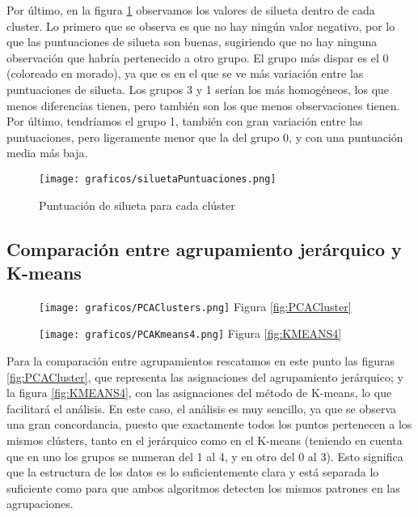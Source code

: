 \documentclass[a4paper,onecolumn]{extarticle}
\begin{document}
\begin{sloppypar}
Por último, en la figura \ref{fig:siluetaClusters} observamos los valores de silueta dentro de cada cluster. Lo primero que se observa es que no hay ningún 
valor negativo, por lo que las puntuaciones de silueta son buenas, sugiriendo que no hay ninguna observación que habría pertenecido a otro grupo. El grupo más 
dispar es el 0 (coloreado en morado), ya que es en el que se ve más variación entre las puntuaciones de silueta. Los grupos 3 y 1 serían los más homogéneos, 
los que menos diferencias tienen, pero también son los que menos observaciones tienen. Por último, tendríamos el grupo 1, también con gran 
variación entre las puntuaciones, pero ligeramente menor que la del grupo 0, y con una puntuación media más baja.
\begin{center}
    \begin{figure}[h!]
        \centering
        \texttt{[image: graficos/siluetaPuntuaciones.png]}
        \caption{Puntuación de silueta para cada clúster}
        \label{fig:siluetaClusters}
    \end{figure}
\end{center}

\subsection{Comparación entre agrupamiento jerárquico y K-means} \label{comparacion}
\begin{center}
    \begin{figure}[h!]
        \centering
        \begin{minipage}{0.49\textwidth}
            \centering
            \texttt{[image: graficos/PCAClusters.png]}
            Figura \ref{fig:PCACluster}
        \end{minipage}
        \hspace{0.005\textwidth} %
        \begin{minipage}{0.49\textwidth}
            \centering
            \texttt{[image: graficos/PCAKmeans4.png]}
            Figura \ref{fig:KMEANS4}
        \end{minipage}
    \end{figure}
\end{center}
Para la comparación entre agrupamientos rescatamos en este punto las figuras \ref{fig:PCACluster}, que representa las asignaciones del agrupamiento jerárquico;
y la figura \ref{fig:KMEANS4}, con las asignaciones del método de K-means, lo que facilitará el análisis. En este caso, el análisis es muy sencillo, ya que 
se observa una gran concordancia, puesto que exactamente todos los puntos pertenecen a los mismos clústers, tanto en el jerárquico como en el K-means 
(teniendo en cuenta que en uno los grupos se numeran del 1 al 4, y en otro del 0 al 3). Esto significa que la estructura de los datos es lo suficientemente clara 
y está separada lo suficiente como para que ambos algoritmos detecten los mismos patrones en las agrupaciones.


\end{sloppypar}
\end{document}
